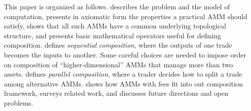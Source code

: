 This paper is organized as follows.
 describes the problem and the model of computation,
 presents in axiomatic form the properties a practical AMM should satisfy,
 shows that all such AMMs have a common underlying topological structure,
and  presents basic mathematical operators useful for defining composition.
 defines \emph{sequential composition},
where the outputs of one trade becomes the inputs to another.
Some careful choices are needed to impose order on composition of ``higher-dimensional''
AMMs that manage more than two assets.
 defines \emph{parallel composition},
where a trader decides how to split a trade among alternative AMMs.
 shows how AMMs with fees fit into out composition framework,
 surveys related work,
and  discusses future directions and open problems.
